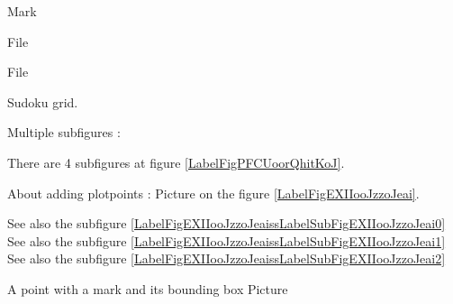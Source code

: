 \begin{center}

\end{center}



Mark

\begin{center}

\end{center}


\begin{center}

\end{center}


File 
\begin{center}

\end{center}


File 
\begin{center}
   
\end{center}
   

Sudoku grid.

\begin{center}
   
\end{center}
   

   \clearpage

Multiple subfigures :

There are 4 subfigures at figure \ref{LabelFigPFCUoorQhitKoJ}. %
\newcommand{\CaptionFigPFCUoorQhitKoJ}{4 subfigures still to be descripted.}



\clearpage

About adding plotpoints : Picture  on the figure \ref{LabelFigEXIIooJzzoJeai}. %
\newcommand{\CaptionFigEXIIooJzzoJeai}{<+Type your caption here+>}

See also the subfigure \ref{LabelFigEXIIooJzzoJeaissLabelSubFigEXIIooJzzoJeai0}
See also the subfigure \ref{LabelFigEXIIooJzzoJeaissLabelSubFigEXIIooJzzoJeai1}
See also the subfigure \ref{LabelFigEXIIooJzzoJeaissLabelSubFigEXIIooJzzoJeai2}



A point with a mark and its bounding box
Picture 
\Huge

\begin{center}
   
\end{center}
\normalsize



